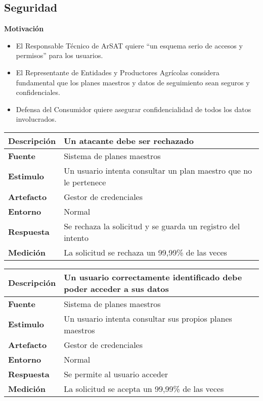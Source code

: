 \subsection{Seguridad}
\textbf{Motivación}
\begin{itemize}
 \item El Responsable T\'ecnico de ArSAT quiere ``un esquema serio de accesos y permisos'' para los usuarios.
 \item El Representante de Entidades y Productores Agr\'icolas considera fundamental que los planes maestros y datos de seguimiento sean seguros y confidenciales.
 \item Defensa del Consumidor quiere asegurar confidencialidad de todos los datos involucrados.
\end{itemize}

\begin{tabular}{| l || p{12cm} |}
\hline 
\textbf{Descripci\'on} & Un atacante debe ser rechazado \\
\hline 
\textbf{Fuente} & Sistema de planes maestros \\
\hline 
\textbf{Estimulo} & Un usuario intenta consultar un plan maestro que no le pertenece \\
\hline 
\textbf{Artefacto} & Gestor de credenciales \\
\hline 
\textbf{Entorno} & Normal \\
\hline 
\textbf{Respuesta} & Se rechaza la solicitud y se guarda un registro del intento \\
\hline 
\textbf{Medici\'on} & La solicitud se rechaza un 99,99\% de las veces \\
\hline 
\end{tabular}

\medskip

\begin{tabular}{| l || p{12cm} |}
\hline 
\textbf{Descripci\'on} & Un usuario correctamente identificado debe poder acceder a sus datos \\
\hline 
\textbf{Fuente} & Sistema de planes maestros \\
\hline 
\textbf{Estimulo} & Un usuario intenta consultar sus propios planes maestros \\
\hline 
\textbf{Artefacto} & Gestor de credenciales \\
\hline 
\textbf{Entorno} & Normal \\
\hline 
\textbf{Respuesta} & Se permite al usuario acceder \\
\hline 
\textbf{Medici\'on} & La solicitud se acepta un 99,99\% de las veces \\
\hline 
\end{tabular}

